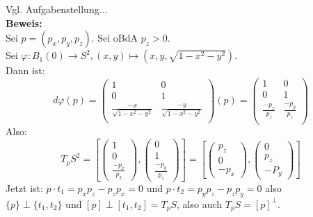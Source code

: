 \begin{problem*}[2b] Vgl. Aufgabenstellung... \\
\textbf{Beweis:} \\
Sei $p = (p_x, p_y, p_z)$. Sei oBdA $ p_z > 0 $.\\
Sei $\varphi : B_1(0) \to S^2, (x,y) \mapsto (x,y,\sqrt{ 1- x^2-y^2 })$. \\
Dann ist:
\begin{equation*} 
   d \varphi(p) = 
   \begin{pmatrix}
      1 & 0 \\
      0 & 1 \\
      \frac{-x}{\sqrt{ 1 - x^2 -y^2 }} & \frac{-y}{\sqrt{ 1 - x^2 -y^2 }} \\
    \end{pmatrix}(p) = 
    \begin{pmatrix}
        1 & 0 \\
      0 & 1 \\
     \frac{-p_x}{p_z} & \frac{-p_y}{p_z} \\
    \end{pmatrix} 
\end{equation*}
Also:
\begin{equation*}
  T_pS^2 = \left[
  \begin{pmatrix}
     1 \\
     0 \\
    \frac{-p_x}{p_z}
  \end{pmatrix},
  \begin{pmatrix}
     0 \\
     1 \\
    \frac{-p_y}{p_z}
  \end{pmatrix}
  \right] = \left[
    \begin{pmatrix}
     p_z\\
     0 \\
     -p_x
  \end{pmatrix},
  \begin{pmatrix}
     0 \\
     p_z \\
     -P_y
  \end{pmatrix}
  \right]
\end{equation*}
Jetzt ist: $p \cdot t_1 = p_xp_z - p_zp_x = 0$ und $ p \cdot t_2 = p_yp_z - p_zp_y = 0$ also \\
$\{ p \} \perp \{ t_1,t_2 \}$ und $[p] \perp [t_1,t_2] = T_pS$, also auch $T_pS = [p]^{ \perp }$.
\end{problem*}

